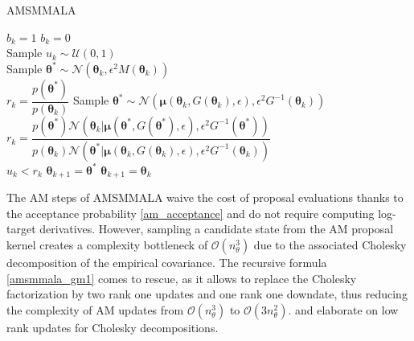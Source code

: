\documentclass[twoside,11pt]{article}
\begin{document}
\begin{algorithm}[t]
	\caption{AMSMMALA}
	\label{amsmmala}
	\begin{algorithmic}
		\State $b_k = 1$
		\Else
		\State $b_k = 0$
		\EndIf\\
		
		\State Sample $u_k\sim\mathcal{U}(0, 1)$\\
		
		 
		\State Sample 
		$\boldsymbol{\theta^{*}}
		\sim\mathcal{N}(\boldsymbol{\theta}_k,
		\epsilon^2 M(\boldsymbol{\theta}_k)) %
		$\\
		
		\State $r_k = \dfrac{p(\boldsymbol{\theta}^{*})}{p(\boldsymbol{\theta}_k)}$
		 
		\State Sample 
		$\boldsymbol{\theta^{*}}
		\sim\mathcal{N}(\boldsymbol{\mu}(\boldsymbol{\theta}_k, G(\boldsymbol{\theta}_k), \epsilon),
		\epsilon^2 G^{-1}(\boldsymbol{\theta}_k))
		$\\

		\State $r_k = \dfrac{
				p(\boldsymbol{\theta}^{*})
				\mathcal{N}(\boldsymbol{\theta}_k|
				\boldsymbol{\mu}(\boldsymbol{\theta}^{*},
				G(\boldsymbol{\theta}^{*}),
				\epsilon),
				\epsilon^2 G^{-1}(\boldsymbol{\theta}^{*}))
			}
			{
				p(\boldsymbol{\theta}_k)
				\mathcal{N}(\boldsymbol{\theta}^{*}|
				\boldsymbol{\mu}(\boldsymbol{\theta}_k,
				G(\boldsymbol{\theta}_k),
				\epsilon),
				\epsilon^2 G^{-1}(\boldsymbol{\theta}_k))
			}$
		\EndIf\\

		\If
		{
			$u_k<r_k$
		}
		  \State $\boldsymbol{\theta}_{k+1}=\boldsymbol{\theta}^{*}$
		\Else
		  \State $\boldsymbol{\theta}_{k+1}=\boldsymbol{\theta}_k$		
		\EndIf
		
		\EndFor
	\end{algorithmic}
\end{algorithm}

The AM steps of AMSMMALA waive the cost of proposal evaluations thanks to the acceptance probability \eqref{am_acceptance}
and do not require computing log-target derivatives. However, sampling a candidate state from the AM proposal kernel creates
a complexity bottleneck of $\mathcal{O}(n_{\theta}^3)$ due to the associated Cholesky decomposition of the empirical 
covariance. The recursive formula \eqref{amsmmala_gm1} comes to rescue, as it allows to replace the Cholesky factorization 
by two rank one updates and one rank one downdate, thus reducing the complexity of AM updates from 
$\mathcal{O}(n_{\theta}^3)$ to $\mathcal{O}(3n_{\theta}^2)$. \cite{gill_gol_wal__met} and \cite{see__low} elaborate on low 
rank updates for Cholesky decompositions.
\end{document}
